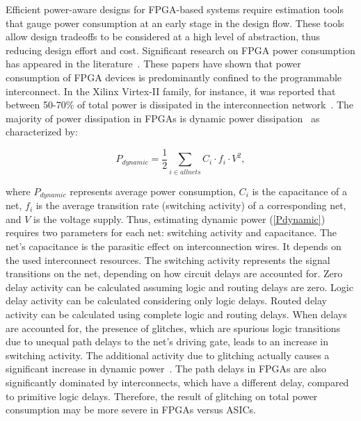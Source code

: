 Efficient power-aware designs for FPGA-based systems require estimation tools that gauge power consumption at an early stage in the design flow.
These tools allow design tradeoffs to be considered at a high level of abstraction, thus reducing design effort and cost.
Significant research on FPGA power consumption has appeared in the literature~\cite{Shang2002,Anderson2004a,Anderson2004,Todorovich2005,Reimer2006}.
These papers have shown that power consumption of FPGA devices is predominantly confined to the programmable interconnect.
In the Xilinx Virtex-II family, for instance, it was reported that between 50-70\% of total power is dissipated in the interconnection network~\cite{Shang2002}.
The majority of power dissipation in FPGAs is dynamic power dissipation~\cite{Shang2002} as characterized by:

\begin{center}
\begin{equation}
\label{Pdynamic}
 P_{\mathit{dynamic}} =\frac{1}{2} \sum\limits_{i \in \mathit{all nets}} C_{i} \cdot f_{i} \cdot V^2,
\end{equation}
\end{center}
where $P_{\mathit{dynamic}}$ represents average power consumption, $C_{i}$ is the capacitance of a net, $f_{i}$ is the average transition rate (switching activity) of a corresponding net, and $V$ is the voltage supply.
Thus, estimating dynamic power (\ref{Pdynamic}) requires two parameters for each net: switching activity and capacitance.
The net's capacitance is the parasitic effect on interconnection wires. It depends on the used interconnect resources.
The switching activity represents the signal transitions on the net, depending on how circuit delays are accounted for.
Zero delay activity can be calculated assuming logic and routing delays are zero. Logic delay activity can be calculated considering only logic delays.
Routed delay activity can be calculated using complete logic and routing delays.
When delays are accounted for, the presence of glitches, which are spurious logic transitions due to unequal path delays to the net’s driving gate, leads to an increase in switching activity.
The additional activity due to glitching actually causes a significant increase in dynamic power~\cite{Anderson2004a}.
The path delays in FPGAs are also significantly dominated by interconnects, which have a different delay, compared to primitive logic delays. Therefore, the result of glitching on total power consumption may be more severe in FPGAs versus ASICs.

